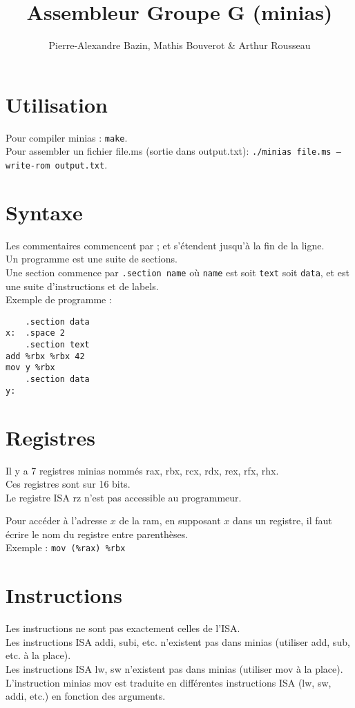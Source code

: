 \documentclass[a4paper]{article}
\title{Assembleur Groupe G (minias)}
\author{Pierre-Alexandre Bazin, Mathis Bouverot \& Arthur Rousseau}
\date{}
\begin{document}
    \maketitle
    \section{Utilisation}
    Pour compiler minias : \texttt{make}.\\
    Pour assembler un fichier file.ms (sortie dans output.txt): \texttt{./minias file.ms --write-rom output.txt}.

    \section{Syntaxe}
    Les commentaires commencent par ; et s'étendent jusqu'à la fin de la ligne.\\
    Un programme est une suite de sections.\\
    Une section commence par \texttt{.section name} où \texttt{name} est soit \texttt{text} soit \texttt{data},
    et est une suite d'instructions et de labels.\\
    Exemple de programme :
\begin{lstlisting}
    .section data
x:  .space 2
    .section text
add %rbx %rbx 42
mov y %rbx
    .section data
y:
\end{lstlisting}

    \section{Registres}
    Il y a 7 registres minias nommés rax, rbx, rcx, rdx, rex, rfx, rhx.\\
    Ces registres sont sur 16 bits.\\
    Le registre ISA rz n'est pas accessible au programmeur.

    Pour accéder à l'adresse $x$ de la ram, en supposant $x$ dans un registre, 
    il faut écrire le nom du registre entre parenthèses.\\
    Exemple : \texttt{mov (\%rax) \%rbx}
    
    \section{Instructions}
    Les instructions ne sont pas exactement celles de l'ISA.\\
    Les instructions ISA addi, subi, etc. n'existent pas dans minias (utiliser add, sub, etc. à la place).\\ 
    Les instructions ISA lw, sw n'existent pas dans minias (utiliser mov à la place).\\
    L'instruction minias mov est traduite en différentes instructions ISA (lw, sw, addi, etc.) en fonction des arguments.
\end{document}
